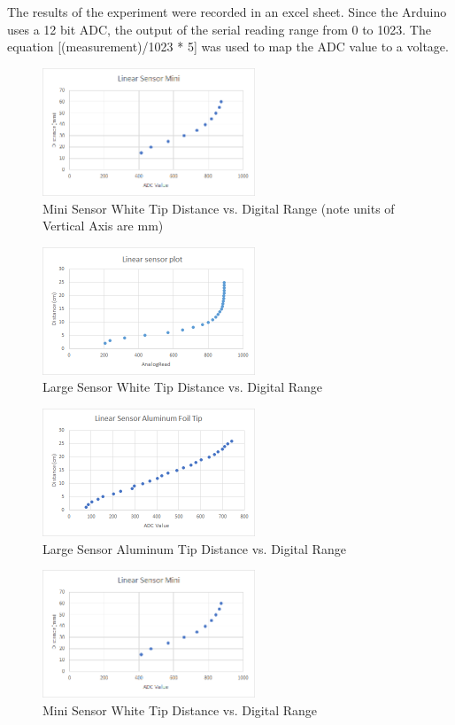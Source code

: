 \documentclass[10pt,conference,compsocconf]{IEEEtran}
\begin{document}
The results of the experiment were recorded in an excel sheet. Since
the Arduino uses a 12 bit ADC, the output of the serial reading range
from 0 to 1023. The equation [(measurement)/1023 * 5] was used to map
the ADC value to a voltage.

\begin{figure}
  \centering
  \includegraphics[width=2.5in]{figures/MiniDistanceVsRead.png}
  \caption{Mini Sensor White Tip Distance vs. Digital Range (note units of Vertical Axis are mm)}  
\end{figure}

\begin{figure}
  \centering
  \includegraphics[width=2.5in]{figures/WhiteLargeDistanceVsRead.png}
  \caption{Large Sensor White Tip Distance vs. Digital Range}  
\end{figure}

\begin{figure}
  \centering
  \includegraphics[width=2.5in]{figures/AluminumLargeFoil.png}
  \caption{Large Sensor Aluminum Tip Distance vs. Digital Range}  
\end{figure}

\begin{figure}
  \centering
  \includegraphics[width=2.5in]{figures/MiniDistanceVsRead.png}
  \caption{Mini Sensor White Tip Distance vs. Digital Range}  
\end{figure}
\end{document}
